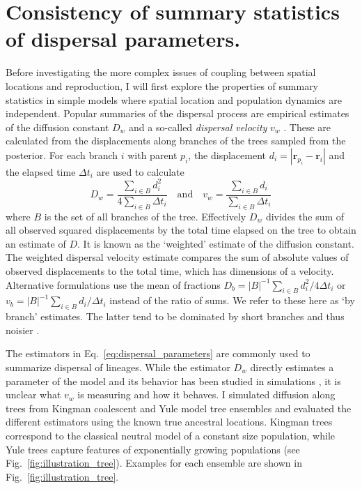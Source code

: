 \documentclass[aps,rmp, twocolumn]{revtex4}
\newcommand{\rvec}{\mathbf{r}}
\begin{document}
\section*{Consistency of summary statistics of dispersal parameters.}
Before investigating the more complex issues of coupling between spatial locations and reproduction, I will first explore the properties of summary statistics in simple models where spatial location and population dynamics are independent.
Popular summaries of the dispersal process are empirical estimates of the diffusion constant $D_w$ \citep{pybus_unifying_2012,trovao_bayesian_2015} and a so-called \emph{dispersal velocity} $v_w$ \citep{lemey_phylogeography_2010,dellicour_using_2017}.
These are calculated from the displacements along branches of the trees sampled from the posterior.
For each branch $i$ with parent $p_i$, the displacement $d_i = |\rvec_{p_i} - \rvec_{i}|$ and the elapsed time $\Delta t_i$ are used to calculate
\begin{equation}
    \label{eq:dispersal_parameters}
    D_w = \frac{\sum_{i\in B}d_i^2}{4\sum_{i\in B} \Delta t_i} \quad \mathrm{and}  \quad v_w = \frac{\sum_{i\in B} d_i}{\sum_{i\in B} \Delta t_i}
\end{equation}
where $B$ is the set of all branches of the tree.
Effectively $D_w$ divides the sum of all observed squared displacements by the total time elapsed on the tree to obtain an estimate of $D$.
It is known as the `weighted' estimate of the diffusion constant.
The weighted dispersal velocity estimate compares the sum of absolute values of observed displacements to the total time, which has dimensions of a velocity.
Alternative formulations use the mean of fractions $D_b = |B|^{-1} \sum_{i\in B}d_i^2/4\Delta t_i$ or $v_b = |B|^{-1} \sum_{i\in B}d_i/\Delta t_i$ instead of the ratio of sums.
We refer to these here as `by branch' estimates.
The latter tend to be dominated by short branches and thus noisier \citep{trovao_bayesian_2015}.

The estimators in Eq.~\ref{eq:dispersal_parameters} are commonly used to summarize dispersal of lineages.
While the estimator $D_w$ directly estimates a parameter of the model and its behavior has been studied in simulations \citep{pybus_unifying_2012}, it is unclear what $v_w$ is measuring and how it behaves.
I simulated diffusion along trees from Kingman coalescent \citep{kingman_coalescent_1982} and Yule model \citep{yule_iimathematical_1925} tree ensembles and evaluated the different estimators using the known true ancestral locations.
Kingman trees correspond to the classical neutral model of a constant size population, while Yule trees capture features of exponentially growing populations (see Fig.~\ref{fig:illustration_tree}).
Examples for each ensemble are shown in Fig.~\ref{fig:illustration_tree}.
\end{document}
